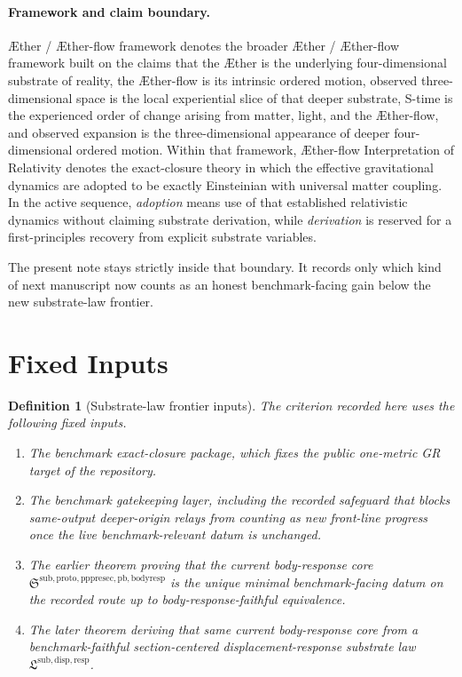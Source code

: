 \documentclass[11pt]{article}
\newcommand{\Aether}{\AE{}ther}
\newcommand{\Aflow}{\AE{}ther-flow}
\newcommand{\TheoryName}{\Aflow{} Interpretation of Relativity}
\newcommand{\TheoryProgram}{\Aether{} / \Aflow{} framework}
\newcommand{\PullbackBodyResponseCore}{\mathfrak S^{\mathrm{sub,proto,pppresec,pb,bodyresp}}}
\newcommand{\SubstrateLaw}{\mathfrak L^{\mathrm{sub,disp,resp}}}
\newtheorem{definition}{Definition}
\begin{document}
\paragraph{Framework and claim boundary.}
\TheoryProgram{} denotes the broader \Aether{} / \Aflow{} framework built on the claims that the \Aether{} is the underlying four-dimensional substrate of reality, the \Aflow{} is its intrinsic ordered motion, observed three-dimensional space is the local experiential slice of that deeper substrate, S-time is the experienced order of change arising from matter, light, and the \Aflow{}, and observed expansion is the three-dimensional appearance of deeper four-dimensional ordered motion. Within that framework, \TheoryName{} denotes the exact-closure theory in which the effective gravitational dynamics are adopted to be exactly Einsteinian with universal matter coupling. In the active sequence, \emph{adoption} means use of that established relativistic dynamics without claiming substrate derivation, while \emph{derivation} is reserved for a first-principles recovery from explicit substrate variables.

The present note stays strictly inside that boundary. It records only which kind of next manuscript now counts as an honest benchmark-facing gain below the new substrate-law frontier.

\section{Fixed Inputs}

\begin{definition}[Substrate-law frontier inputs]
The criterion recorded here uses the following fixed inputs.
\begin{enumerate}
    \item The benchmark exact-closure package, which fixes the public one-metric GR target of the repository.
    \item The benchmark gatekeeping layer, including the recorded safeguard that blocks same-output deeper-origin relays from counting as new front-line progress once the live benchmark-relevant datum is unchanged.
    \item The earlier theorem proving that the current body-response core \(\PullbackBodyResponseCore\) is the unique minimal benchmark-facing datum on the recorded route up to body-response-faithful equivalence.
    \item The later theorem deriving that same current body-response core from a benchmark-faithful section-centered displacement-response substrate law \(\SubstrateLaw\).
\end{enumerate}
\end{definition}
\end{document}
